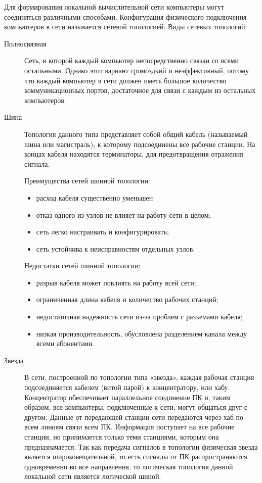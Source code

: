 Для формирования локальной вычислительной сети компьютеры могут соединяться различными способами. Конфигурация физического подключения компьютеров в сети называется сетевой топологией.
Виды сетевых топологий:
\begin{description}
\item[Полносвязная]
  Сеть, в которой каждый компьютер непосредственно связан со всеми остальными. Однако этот вариант громоздкий и неэффективный, потому что каждый компьютер в сети должен иметь большое количество коммуникационных портов, достаточное для связи с каждым из остальных компьютеров. 
\item[Шина]
  Топология данного типа представляет собой общий кабель (называемый шина или магистраль), к которому подсоединены все рабочие станции. На концах кабеля находятся терминаторы, для предотвращения отражения сигнала. 

  Преимущества сетей шинной топологии:
  \begin{itemize}
  \item расход кабеля существенно уменьшен
  \item отказ одного из узлов не влияет на работу сети в целом;
  \item сеть легко настраивать и конфигурировать;
  \item сеть устойчива к неисправностям отдельных узлов.
  \end{itemize}
  Недостатки сетей шинной топологии:
  \begin{itemize}
  \item разрыв кабеля может повлиять на работу всей сети;
  \item ограниченная длина кабеля и количество рабочих станций;
  \item недостаточная надежность сети из-за проблем с разъемами кабеля;
  \item низкая производительность, обусловлена разделением канала между    всеми абонентами.
  \end{itemize}


\item[Звезда]
  В сети, построенной по топологии типа «звезда», каждая рабочая станция подсоединяется кабелем (витой парой) к концентратору, или хабу. Концентратор обеспечивает параллельное соединение ПК и, таким образом, все компьютеры, подключенные к сети, могут общаться друг с другом.
  Данные от передающей станции сети передаются через хаб по всем линиям связи всем ПК. Информация поступает на все рабочие станции, но принимается только теми станциями, которым она предназначается. Так как передача сигналов в топологии физическая звезда является широковещательной, то есть сигналы от ПК распространяются одновременно во все направления, то логическая топология данной локальной сети является логической шиной. 


\end{description}
